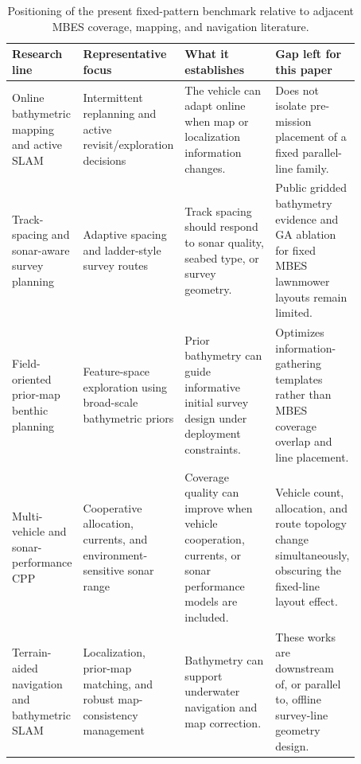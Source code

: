 \documentclass[jmse,article,submit,moreauthors]{Definitions/mdpi}
\begin{document}
\begin{table}[!htbp]
	\centering
	\caption{Positioning of the present fixed-pattern benchmark relative to adjacent MBES coverage, mapping, and navigation literature.}
	\label{tab:positioning}
	\scriptsize
	\renewcommand{\arraystretch}{1.15}
	\begin{tabular}{@{}>{\raggedright\arraybackslash}p{0.18\linewidth}>{\raggedright\arraybackslash}p{0.22\linewidth}>{\raggedright\arraybackslash}p{0.26\linewidth}>{\raggedright\arraybackslash}p{0.21\linewidth}@{}}
		\toprule[1bp]
		\textbf{Research line} & \textbf{Representative focus} & \textbf{What it establishes} & \textbf{Gap left for this paper} \\
		\midrule[1bp]
		Online bathymetric mapping and active SLAM & Intermittent replanning and active revisit/exploration decisions \cite{shi2020data,zhang2022online,ling2023active,zhang2024tttslam,real2025acousticgraphslam} & The vehicle can adapt online when map or localization information changes. & Does not isolate pre-mission placement of a fixed parallel-line family. \\
		Track-spacing and sonar-aware survey planning & Adaptive spacing and ladder-style survey routes \cite{yordanova2020coverage,jiang2018route,zhao2024coastalcpp,zhao2024jointcpp} & Track spacing should respond to sonar quality, seabed type, or survey geometry. & Public gridded bathymetry evidence and GA ablation for fixed MBES lawnmower layouts remain limited. \\
		Field-oriented prior-map benthic planning & Feature-space exploration using broad-scale bathymetric priors \cite{shields2023feature} & Prior bathymetry can guide informative initial survey design under deployment constraints. & Optimizes information-gathering templates rather than MBES coverage overlap and line placement. \\
		Multi-vehicle and sonar-performance CPP & Cooperative allocation, currents, and environment-sensitive sonar range \cite{xie2024three,li2024multi,mu2025coverage,yao2021coverage,dogru2022ecocpp,wang2025ddqn} & Coverage quality can improve when vehicle cooperation, currents, or sonar performance models are included. & Vehicle count, allocation, and route topology change simultaneously, obscuring the fixed-line layout effect. \\
		Terrain-aided navigation and bathymetric SLAM & Localization, prior-map matching, and robust map-consistency management \cite{zhou2017terrain,kim2017panel,zhu2025robust,ma2023terrainreview,zhang2023rbpf,ding2022contour,zhang2024ambiguouspf,sture2023gpbathy,ma2025zonotope} & Bathymetry can support underwater navigation and map correction. & These works are downstream of, or parallel to, offline survey-line geometry design. \\

\end{tabular}
\end{table}
\end{document}
